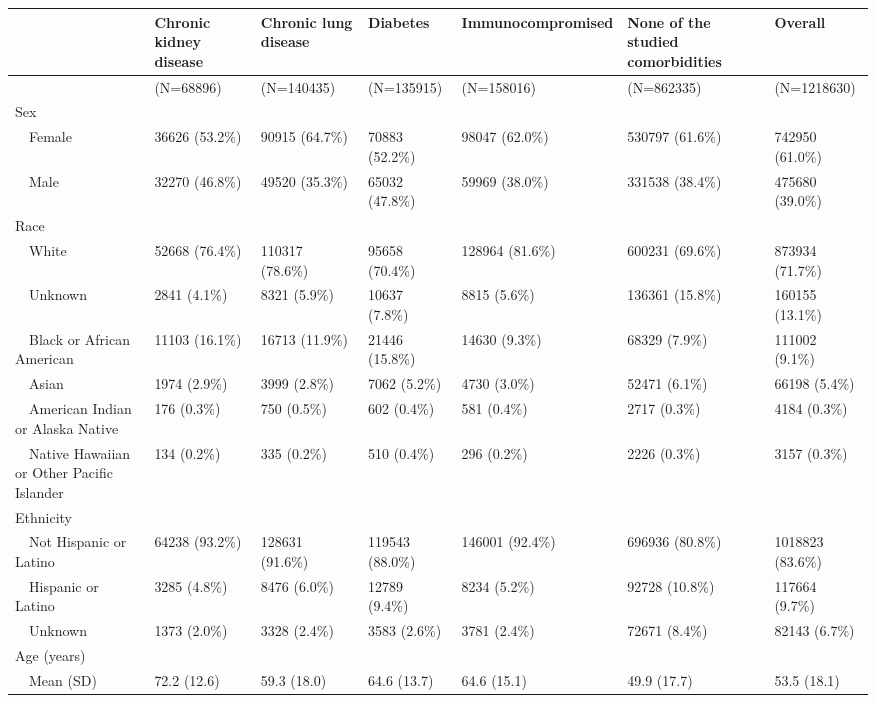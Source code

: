 \begin{table}[!htbp]
\centering
\begin{tabular}{lllllll}
  \hline
  & Chronic kidney disease & Chronic lung disease & Diabetes & Immunocompromised & None of the studied comorbidities & Overall \\ 
  \hline
 & (N=68896) & (N=140435) & (N=135915) & (N=158016) & (N=862335) & (N=1218630) \\ 
  Sex &  &  &  &  &  &  \\ 
    Female & 36626 (53.2\%) & 90915 (64.7\%) & 70883 (52.2\%) & 98047 (62.0\%) & 530797 (61.6\%) & 742950 (61.0\%) \\ 
    Male & 32270 (46.8\%) & 49520 (35.3\%) & 65032 (47.8\%) & 59969 (38.0\%) & 331538 (38.4\%) & 475680 (39.0\%) \\ 
  Race &  &  &  &  &  &  \\ 
    White & 52668 (76.4\%) & 110317 (78.6\%) & 95658 (70.4\%) & 128964 (81.6\%) & 600231 (69.6\%) & 873934 (71.7\%) \\ 
    Unknown & 2841 (4.1\%) & 8321 (5.9\%) & 10637 (7.8\%) & 8815 (5.6\%) & 136361 (15.8\%) & 160155 (13.1\%) \\ 
    Black or African American & 11103 (16.1\%) & 16713 (11.9\%) & 21446 (15.8\%) & 14630 (9.3\%) & 68329 (7.9\%) & 111002 (9.1\%) \\ 
    Asian & 1974 (2.9\%) & 3999 (2.8\%) & 7062 (5.2\%) & 4730 (3.0\%) & 52471 (6.1\%) & 66198 (5.4\%) \\ 
    American Indian or Alaska Native & 176 (0.3\%) & 750 (0.5\%) & 602 (0.4\%) & 581 (0.4\%) & 2717 (0.3\%) & 4184 (0.3\%) \\ 
    Native Hawaiian or Other Pacific Islander & 134 (0.2\%) & 335 (0.2\%) & 510 (0.4\%) & 296 (0.2\%) & 2226 (0.3\%) & 3157 (0.3\%) \\ 
  Ethnicity &  &  &  &  &  &  \\ 
    Not Hispanic or Latino & 64238 (93.2\%) & 128631 (91.6\%) & 119543 (88.0\%) & 146001 (92.4\%) & 696936 (80.8\%) & 1018823 (83.6\%) \\ 
    Hispanic or Latino & 3285 (4.8\%) & 8476 (6.0\%) & 12789 (9.4\%) & 8234 (5.2\%) & 92728 (10.8\%) & 117664 (9.7\%) \\ 
    Unknown & 1373 (2.0\%) & 3328 (2.4\%) & 3583 (2.6\%) & 3781 (2.4\%) & 72671 (8.4\%) & 82143 (6.7\%) \\ 
  Age (years) &  &  &  &  &  &  \\ 
    Mean (SD) & 72.2 (12.6) & 59.3 (18.0) & 64.6 (13.7) & 64.6 (15.1) & 49.9 (17.7) & 53.5 (18.1) \\ 

\end{tabular}
\end{table}
